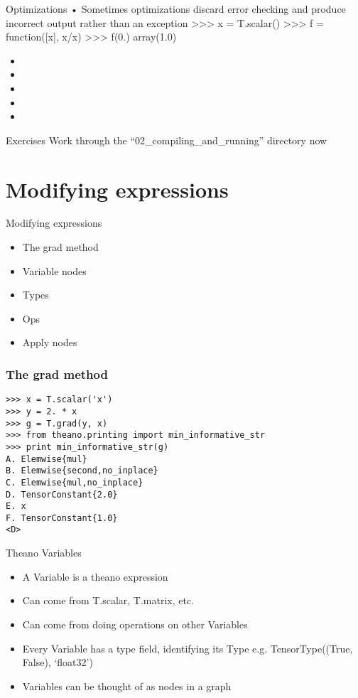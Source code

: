 \documentclass[utf8x,xcolor=pdftex,dvipsnames,table]{beamer}
\begin{document}
\begin{frame}{Optimizations}
• Sometimes optimizations discard error
checking and produce incorrect output
rather than an exception
>>> x = T.scalar()
>>> f = function([x], x/x)
>>> f(0.)
array(1.0)

  
  \begin{itemize}
  \item 
  \item 
  \item 
  \item 
  \item 
  \end{itemize}
\end{frame}

\begin{frame}{Exercises}
Work through the ``02\_compiling\_and\_running'' directory now
\end{frame}

\section{Modifying expressions}
\begin{frame}{Modifying expressions}
  \begin{itemize}
  \item The grad method
  \item Variable nodes
  \item Types
  \item Ops
  \item Apply nodes
  \end{itemize}
\end{frame}

\begin{frame}[fragile]
  \frametitle{The grad method}

\begin{lstlisting}
>>> x = T.scalar('x')
>>> y = 2. * x
>>> g = T.grad(y, x)
>>> from theano.printing import min_informative_str
>>> print min_informative_str(g)
A. Elemwise{mul}
B. Elemwise{second,no_inplace}
C. Elemwise{mul,no_inplace}
D. TensorConstant{2.0}
E. x
F. TensorConstant{1.0}
<D>
\end{lstlisting}
\end{frame}

\begin{frame}{Theano Variables}
  \begin{itemize}
  \item A Variable is a theano expression
  \item Can come from T.scalar, T.matrix, etc.
  \item Can come from doing operations on other Variables
  \item Every Variable has a type field, identifying its Type \newline
    e.g. TensorType((True, False), ‘float32’)
  \item Variables can be thought of as nodes in a graph
  \end{itemize}
\end{frame}
\end{document}
